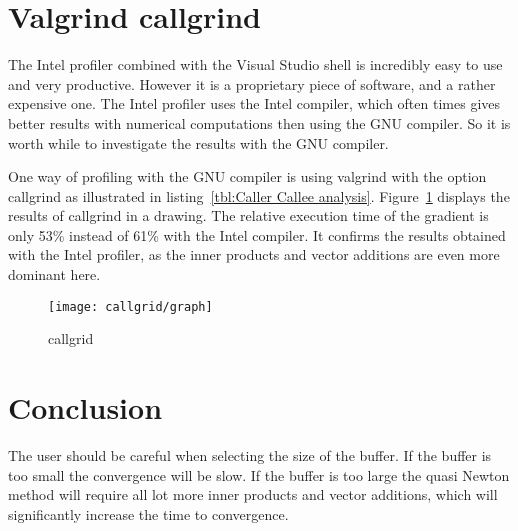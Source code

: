 \section{Valgrind callgrind}
The Intel profiler combined with the Visual Studio shell is incredibly easy to use and very productive. However it is a proprietary piece of software, and a rather expensive one. The Intel profiler uses the Intel compiler, which often times gives better results with numerical computations then using the GNU compiler. So it is worth while to investigate the results with the GNU compiler.

One way of profiling with the GNU compiler is using valgrind with the option callgrind as illustrated in listing~\ref{tbl:Caller Callee analysis}. Figure~\ref{fig:callgrid} displays the results of callgrind in a drawing. The relative execution time of the gradient is only 53\% instead of 61\% with the Intel compiler. It confirms the results obtained with the Intel profiler, as the inner products and vector additions are even more dominant here.

\begin{figure}[H]
	\centering
	\texttt{[image: callgrid/graph]}
	\caption{callgrid}
	\label{fig:callgrid}
\end{figure}

\section{Conclusion}
The user should be careful when selecting the size of the buffer. If the buffer is too small the convergence will be slow. If the buffer is too large the quasi Newton method will require all lot more inner products and vector additions, which will significantly increase the time to convergence.
